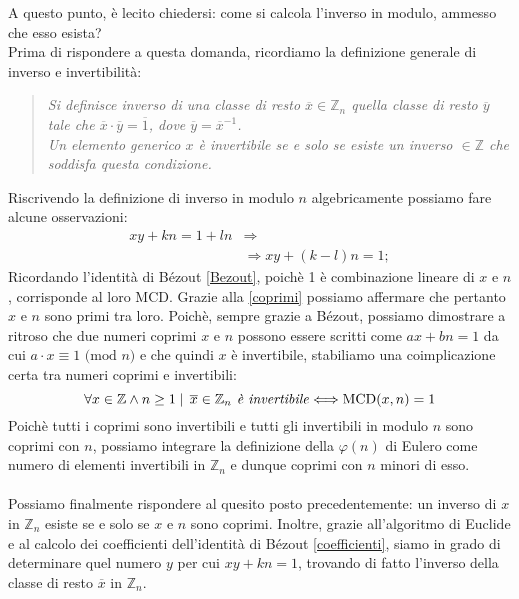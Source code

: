 A questo punto, è lecito chiedersi: come si calcola l'inverso in modulo, ammesso che esso esista?\\
Prima di rispondere a questa domanda, ricordiamo la definizione generale di inverso e invertibilità:
\begin{quote}
    \emph{Si definisce inverso di una classe di resto $\overline{x} \in \mathbb{Z}_n$ quella classe di resto $\overline{y}$ tale che $\overline{x} \cdot \overline{y} = \overline{1}$, dove $\overline{y}=\overline{x}^{-1}$.\\
    Un elemento generico $x$ è invertibile se e solo se esiste un inverso $\in \mathbb{Z}$ che soddisfa questa condizione.}
\end{quote}
Riscrivendo la definizione di inverso in modulo $n$ algebricamente possiamo fare alcune osservazioni:
\begin{equation}
\begin{split}
xy+kn=1+ln & \Longrightarrow\\
& \Longrightarrow xy + (k-l)n = 1;
\end{split}
\end{equation}
Ricordando l'identità di B\'ezout \eqref{Bezout}, poichè 1 è combinazione lineare di $x$ e $n$, corrisponde al loro MCD. Grazie alla \eqref{coprimi} possiamo affermare che pertanto $x$ e $n$ sono primi tra loro. Poichè, sempre grazie a B\'ezout, possiamo dimostrare a ritroso che due numeri coprimi $x$ e $n$ possono essere scritti come $ax+bn=1$ da cui $a \cdot x \equiv 1 \text{ (mod $n$)}$ e che quindi $x$ è invertibile, stabiliamo una coimplicazione certa tra numeri coprimi e invertibili:
\begin{equation}\label{CoprimiInvertibili}
\forall x \in \mathbb{Z} \land n \geq 1 \mid \, \overline{x} \in \mathbb{Z}_n \text{\emph{ è invertibile}} \Longleftrightarrow \text{MCD}(x,n)=1
\end{equation}
Poichè tutti i coprimi sono invertibili e tutti gli invertibili in modulo $n$ sono coprimi con $n$, possiamo integrare la definizione della $\varphi(n)$ di Eulero come numero di elementi invertibili in $\mathbb{Z}_n$ e dunque coprimi con $n$ minori di esso.\\\\
Possiamo finalmente rispondere al quesito posto precedentemente: un inverso di $x$ in $\mathbb{Z}_n$ esiste se e solo se $x$ e $n$ sono coprimi. Inoltre, grazie all'algoritmo di Euclide e al calcolo dei coefficienti dell'identità di B\'ezout \eqref{coefficienti}, siamo in grado di determinare quel numero $y$ per cui $xy+kn=1$, trovando di fatto l'inverso della classe di resto $\overline{x}$ in $\mathbb{Z}_n$.\\\\